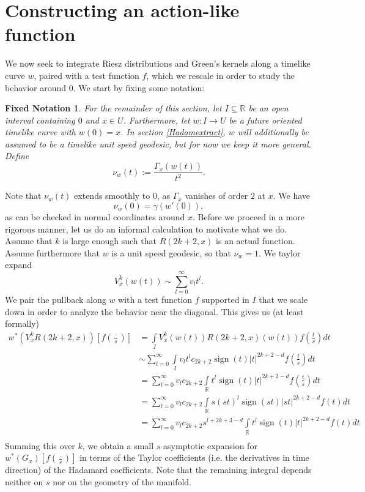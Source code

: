 \documentclass[11pt]{article}
\def\R{{\mathbb{R}}}
\def\insum#1{\sum\limits_{#1=0}^\infty}
\newtheorem{gn}[df]{Fixed Notation}
\DeclareMathOperator{\sign}{sign}
\begin{document}
\section{Constructing an action-like function}
\label{caf}
We now seek to integrate Riesz distributions and Green's kernels along a timelike curve $w$, paired with a test function $f$, which we rescale in order to study the behavior around $0$.
We start by fixing some notation:
\begin{gn}
	\label{dfw}
	For the remainder of this section, let $I\subseteq\R$ be an open interval containing $0$ and $x\in U$. Furthermore, let $w\colon I\rightarrow U$ be a future oriented timelike curve with $w(0)=x$. In section \ref{Hadamextract}, $w$ will additionally be assumed to be a timelike unit speed geodesic, but for now we keep it more general. Define 
	\[\nu_w(t):=\frac{\Gamma_x(w(t))}{t^2}.\]
\end{gn}
Note that $\nu_w(t)$ extends smoothly to $0$, as $\Gamma_x$ vanishes of order $2$ at $x$. We have
\[\nu_w(0)=\gamma(w'(0)),\]
as can be checked in normal coordinates around $x$.
Before we proceed in a more rigorous manner, let us do an informal calculation to motivate what we do. Assume that $k$ is large enough such that $R(2k+2,x)$ is an actual function. Assume furthermore that $w$ is a unit speed geodesic, so that $\nu_w=1$. We taylor expand 
\[V^k_x(w(t))\sim\insum{l}v_l t^l.\]
We pair the pullback along $w$ with a test function $f$ supported in $I$ that we scale down in order to analyze the behavior near the diagonal. This gives us (at least formally)
\begin{align*}
	w^*(V^k_xR(2k+2,x))[f(\tfrac{\cdot}{s})]&=\int\limits_I V^k_x(w(t))R(2k+2,x)(w(t))f(\tfrac{t}{s})dt\\
	&\sim \insum{l}\int\limits_I v_lt^l c_{2k+2} \sign(t)|t|^{2k+2-d}f(\tfrac{t}{s})dt\\
	&=\insum{l}v_l c_{2k+2} \int\limits_\R t^l  \sign(t)|t|^{2k+2-d}f(\tfrac{t}{s})dt\\
	&=\insum{l}v_l c_{2k+2}\int\limits_\R s(st)^l  \sign(st)|st|^{2k+2-d}f(t)dt\\
	&=\insum{l}v_l c_{2k+2}s^{l+2k+3-d} \int\limits_\R t^l  \sign(t)|t|^{2k+2-d}f(t)dt\\
\end{align*}
Summing this over $k$, we obtain a small $s$ asymptotic expansion for $w^*(G_x)[f(\tfrac{\cdot}{s})]$ in terms of the Taylor coefficients (i.e. the derivatives in time direction) of the Hadamard coefficients. Note that the remaining integral depends neither on $s$ nor on the geometry of the manifold.
\end{document}
